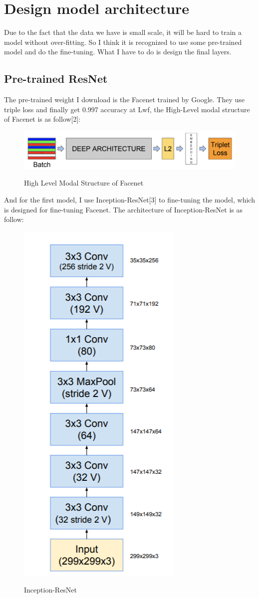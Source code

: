 \documentclass{article}
\begin{document}
\section{Design model architecture}
Due to the fact that the data we have is small scale, it will be hard to train a model without over-fitting. So I think it is recognized to use some pre-trained model and do the fine-tuning.  What I have to do is design the final layers.

\subsection{Pre-trained ResNet}
The pre-trained weight I download is the Facenet trained by Google. They use triple loss and finally get 0.997 accuracy at Lwf, the High-Level modal structure of Facenet is as follow[2]:
\begin{figure}[H]%
  \centering
  \caption{High Level Modal Structure of Facenet}
  \includegraphics[width=\columnwidth]{IMG/facenet.png} %
  \label{Fig.RNN} %
\end{figure}
And for the first model, I use Inception-ResNet[3] to fine-tuning the model, which is designed for fine-tuning Facenet. The architecture of Inception-ResNet is as follow:
\begin{figure}[H]%
  \centering
  \caption{Inception-ResNet}
  \includegraphics[width=18ex]{IMG/RESNET.png} %
  \label{Fig.RNN} %
\end{figure}
\end{document}
